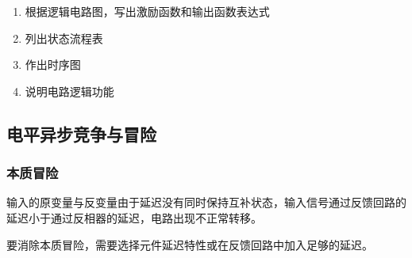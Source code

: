 \begin{enumerate}
    \item 根据逻辑电路图，写出激励函数和输出函数表达式
    \item 列出状态流程表
    \item 作出时序图
    \item 说明电路逻辑功能
\end{enumerate}

\subsection{电平异步竞争与冒险}

\subsubsection{本质冒险}

输入的原变量与反变量由于延迟没有同时保持互补状态，输入信号通过反馈回路的延迟小于通过反相器的延迟，电路出现不正常转移。

要消除本质冒险，需要选择元件延迟特性或在反馈回路中加入足够的延迟。

\newpage
